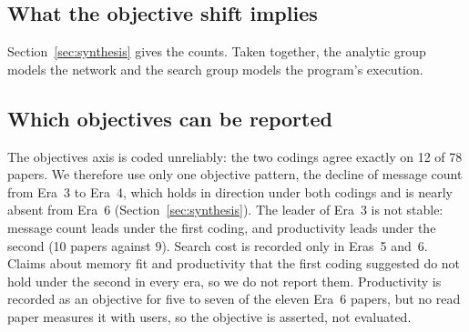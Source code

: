 \subsection{What the objective shift implies}
Section~\ref{sec:synthesis} gives the counts. Taken together, the analytic group models the network and the search group models the program's execution. 

\subsection{Which objectives can be reported}
The objectives axis is coded unreliably: the two codings agree exactly on 12 of 78 papers. We therefore use only one objective pattern, the decline of message count from Era~3 to Era~4, which holds in direction under both codings and is nearly absent from Era~6 (Section~\ref{sec:synthesis}). The leader of Era~3 is not stable: message count leads under the first coding, and productivity leads under the second (10 papers against 9). Search cost is recorded only in Eras~5 and~6. Claims about memory fit and productivity that the first coding suggested do not hold under the second in every era, so we do not report them. Productivity is recorded as an objective for five to seven of the eleven Era~6 papers, but no read paper measures it with users, so the objective is asserted, not evaluated.
